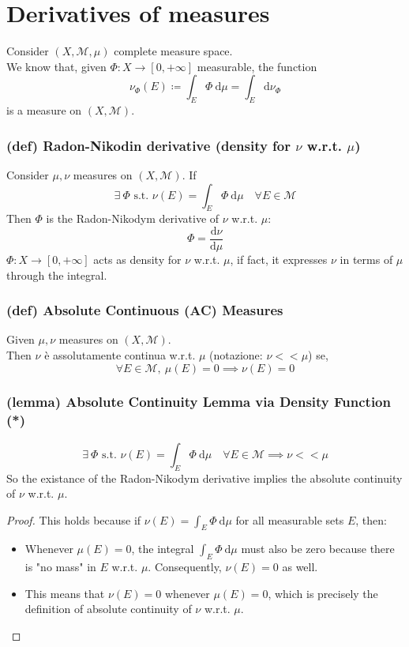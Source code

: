 \section{Derivatives of measures}
Consider $(X,\mathcal M,\mu)$ complete measure space.\\
We know that, given $\Phi :X\to [0,+\infty]$ measurable, the function
$$\nu_\Phi(E) \coloneqq \int_E \Phi \ \mathrm d\mu=\int_E \mathrm d\nu_\Phi$$
is a measure on $(X,\mathcal M)$.
\subsubsection{(def) Radon-Nikodin derivative (density for $\nu$ w.r.t. $\mu$)}
Consider $\mu, \nu$ measures on $(X,\mathcal M)$. If 
$$\exists\ \Phi \text{ s.t. } \nu(E)=\int_E \Phi\ \mathrm d\mu\quad \forall E\in \mathcal M$$
Then $\Phi$ is the Radon-Nikodym derivative of $\nu$ w.r.t. $\mu$:
$$\Phi = \frac{\mathrm d\nu}{\mathrm d\mu}$$
$\Phi:X\to[0,+\infty]$ acts as density for $\nu$ w.r.t. $\mu$, if fact, it expresses $\nu$ in terms of $\mu$ through the integral.
\subsubsection{(def) Absolute Continuous (AC) Measures}
Given $\mu, \nu$ measures on $(X,\mathcal M)$.\\
Then $\nu$ è assolutamente continua w.r.t. $\mu$ (notazione: $\nu << \mu$) se, 
$$\forall E \in \mathcal M,\ \mu(E)=0\implies \nu(E)=0$$
\subsubsection{(lemma) Absolute Continuity Lemma via Density Function 
 (*)}
$$\exists\ \Phi \text{ s.t. }\nu(E)=\int_E \Phi\ \mathrm d\mu\quad \forall E\in \mathcal M\implies \nu<<\mu$$
So the existance of the Radon-Nikodym derivative implies the absolute continuity of $\nu$ w.r.t. $\mu$.
\begin{proof}
 This holds because if $\nu(E)=\int_E\Phi\ \mathrm d\mu$ for all measurable sets $E$, then:
\begin{itemize}
    \item Whenever $\mu(E)=0$, the integral $\int_E \Phi \ \mathrm d\mu$ must also be zero because there is "no mass" in $E$ w.r.t. $\mu$. Consequently, $\nu(E)=0$ as well.
    \item This means that $\nu(E)=0$ whenever $\mu(E)=0$, which is precisely the definition of absolute continuity of $\nu$ w.r.t. $\mu$.
\end{itemize}   
\end{proof}


